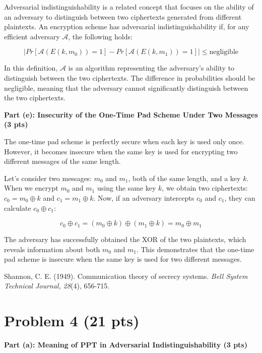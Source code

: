 \documentclass{article}
\begin{document}
Adversarial indistinguishability is a related concept that focuses on the ability of an adversary to distinguish between two ciphertexts generated from different plaintexts. An encryption scheme has adversarial indistinguishability if, for any efficient adversary $\mathcal{A}$, the following holds:

\[
|Pr[\mathcal{A}(E(k, m_0)) = 1] - Pr[\mathcal{A}(E(k, m_1)) = 1]| \leq \text{negligible}
\]

In this definition, $\mathcal{A}$ is an algorithm representing the adversary's ability to distinguish between the two ciphertexts. The difference in probabilities should be negligible, meaning that the adversary cannot significantly distinguish between the two ciphertexts.

\textbf{Part (e): Insecurity of the One-Time Pad Scheme Under Two Messages (3 pts)}

The one-time pad scheme is perfectly secure when each key is used only once. However, it becomes insecure when the same key is used for encrypting two different messages of the same length. 

Let's consider two messages: $m_0$ and $m_1$, both of the same length, and a key $k$. When we encrypt $m_0$ and $m_1$ using the same key $k$, we obtain two ciphertexts: $c_0 = m_0 \oplus k$ and $c_1 = m_1 \oplus k$. Now, if an adversary intercepts $c_0$ and $c_1$, they can calculate $c_0 \oplus c_1$:

\[c_0 \oplus c_1 = (m_0 \oplus k) \oplus (m_1 \oplus k) = m_0 \oplus m_1\]

The adversary has successfully obtained the XOR of the two plaintexts, which reveals information about both $m_0$ and $m_1$. This demonstrates that the one-time pad scheme is insecure when the same key is used for two different messages.

\begin{thebibliography}{9}
     Shannon, C. E. (1949). Communication theory of secrecy systems. \textit{Bell System Technical Journal, 28}(4), 656-715.
\end{thebibliography}

\section*{Problem 4 (21 pts)}

\textbf{Part (a): Meaning of PPT in Adversarial Indistinguishability (3 pts)}
\end{document}
